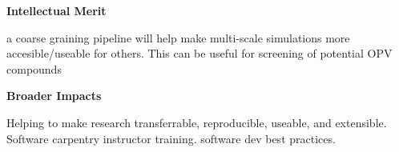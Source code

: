 \begin{center}
    \textbf{Intellectual Merit}
\end{center}
a coarse graining pipeline will help make multi-scale simulations more accesible/useable for others. This can be useful for screening of potential OPV compounds


\begin{center}
    \textbf{Broader Impacts}
\end{center}


Helping to make research transferrable, reproducible, useable, and extensible. Software carpentry instructor training. software dev best practices. 
